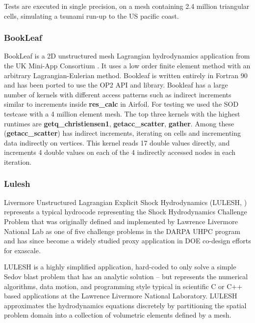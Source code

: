 Tests are executed in single precision, on a mesh containing 2.4 million
triangular cells, simulating a tsunami run-up to the US pacific coast.

\subsubsection{BookLeaf}
BookLeaf is a 2D unstructured mesh Lagrangian hydrodynamics application from the
UK Mini-App Consortium \cite{uk-mac}. It uses a low order finite element method
with an arbitrary Lagrangian-Eulerian method.  Bookleaf is written entirely in
Fortran 90 and has been ported to use the OP2 API and library. Bookleaf has a
large number of kernels with different access patterns such as indirect
increments similar to increments inside \textbf{res\_calc} in Airfoil. For
testing we used the SOD testcase with a 4 million element mesh. The top three
kernels with the highest runtimes are \textbf{getq\_christiensen1},
\textbf{getacc\_scatter}, \textbf{gather}. Among these (\textbf{getacc\_scatter}) has indirect increments, iterating on cells and incrementing data indirectly on vertices. This kernel reads 17 double values directly, and
increments 4 double values on each of the 4 indirectly accessed nodes in each
iteration.

\subsubsection{Lulesh}\label{sec:lulesh-summary}


Livermore Unstructured Lagrangian Explicit Shock Hydrodynamics (LULESH,
\cite{LULESH2:changes}) represents a typical hydrocode representing the Shock
Hydrodynamics Challenge Problem that was originally defined and implemented by
Lawrence Livermore National Lab as one of five challenge problems in the DARPA
UHPC program and has since become a widely studied proxy application in DOE
co-design efforts for exascale. 

LULESH is a highly simplified application, hard-coded to only solve a simple
Sedov blast problem that has an analytic solution \cite{LULESH:spec} – but
represents the numerical algorithms, data motion, and programming style typical
in scientific C or C++ based applications at the Lawrence Livermore National
Laboratory. LULESH approximates the hydrodynamics equations discretely by
partitioning the spatial problem domain into a collection of volumetric elements
defined by a mesh.

